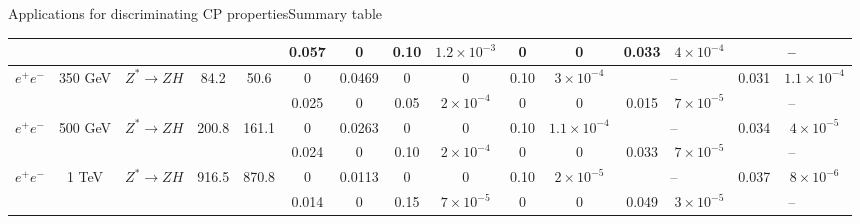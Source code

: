 \documentclass[usenames,dvipsnames,svgnames,table]{beamer}
\begin{document}
\begin{frame}{Applications for discriminating CP properties}{Summary table}
{\begin{tabular}{|lcccc || cccccc || cccc |}
         &               &                            &         &       &  0.057 &  0 & 0.10 & $1.2\times10^{-3}$ &  0 & 0  & 0.033 & $4\!\times\!10^{-4}$ & \multicolumn{2}{c|}{ --  }  \\
\hline
$e^+e^-$ & 350 GeV & $Z^*\to ZH$ & 84.2 &  50.6 &  0 & 0.0469 & 0 & 0  & 0.10  & $3\times10^{-4}$ & \multicolumn{2}{c}{ --  } & 0.031 &  $1.1\!\times\!10^{-4}$ \\
        &               &                            &         &       &  0.025  &  0 & 0.05 & $2\times10^{-4}$ &  0 & 0  & 0.015 & $7\!\times\!10^{-5}$   & \multicolumn{2}{c|}{ --  }   \\
\hline
$e^+e^-$ & 500 GeV & $Z^*\to ZH$ & 200.8 &  161.1 &  0 & 0.0263 & 0 & 0  & 0.10 & $1.1\times10^{-4}$ & \multicolumn{2}{c}{ --  } & 0.034 &  $4\!\times\!10^{-5}$ \\
        &               &                            &         &       &   0.024 &  0 & 0.10 & $2\times10^{-4}$  &  0 & 0  & 0.033 &  $7\!\times\!10^{-5}$ & \multicolumn{2}{c|}{ --  }   \\
\hline
$e^+e^-$ & 1 TeV     & $Z^*\to ZH$ & 916.5 &  870.8 &   0 & 0.0113 & 0 & 0 & 0.10 & $2\times10^{-5}$ & \multicolumn{2}{c}{ --  } & 0.037 &  $8\!\times\!10^{-6}$ \\
        &               &                            &                        &       &  0.014 &  0 & 0.15 & $7\times10^{-5}$  &  0 & 0  & 0.049 & $3\!\times\!10^{-5}$ & \multicolumn{2}{c|}{ --  }  \\
\hline
\hline
\end{tabular}
}
\end{frame}
\end{document}
